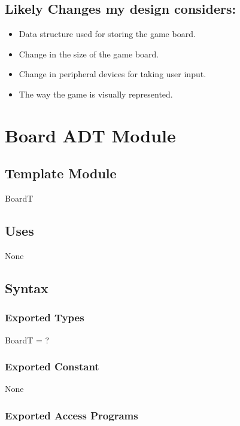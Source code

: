 \documentclass[12pt]{article}
\begin{document}
\subsection*{Likely Changes my design considers:}
\begin{itemize}
    \item Data structure used for storing the game board.
    \item Change in the size of the game board.
    \item Change in peripheral devices for taking user input.
    \item The way the game is visually represented.
\end{itemize}

\newpage

\section* {Board ADT Module}

\subsection*{Template Module}

BoardT

\subsection* {Uses}
None
\subsection* {Syntax}
\subsubsection* {Exported Types}
BoardT = ?
\subsubsection* {Exported Constant}
None
\subsubsection* {Exported Access Programs}
\end{document}
